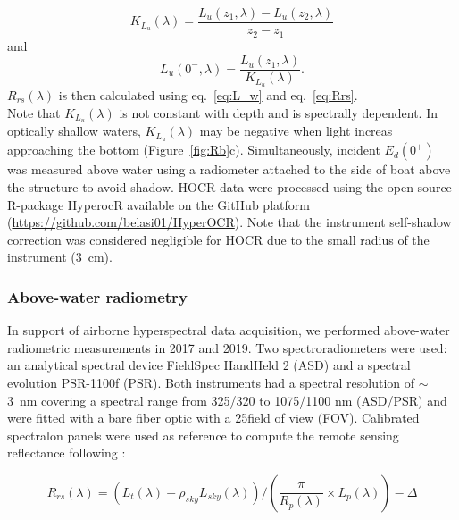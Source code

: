 \documentclass[essd, manuscript]{copernicus}
\begin{document}
\begin{equation}
    K_{L_u}(\lambda) = \frac{L_u(z_1,\lambda) - L_u(z_2,\lambda)}{z_2-z_1}
\end{equation}
and
\begin{equation}
    L_u(0^-,\lambda) = \frac{L_u(z_1,\lambda)}{K_{L_u}(\lambda)}.
\end{equation}
$R_{rs}(\lambda)$ is then calculated using eq.~\ref{eq:L_w} and eq.~\ref{eq:Rrs}. \\

Note that $K_{L_u}(\lambda)$ is not constant with depth and is spectrally dependent. In optically shallow waters, $K_{L_u}(\lambda)$ may be negative when light increas approaching the bottom (Figure~\ref{fig:Rb}c). Simultaneously, incident $E_d(0^+)$ was measured above water using a radiometer attached to the side of boat above the structure to avoid shadow. HOCR data were processed using the open-source R-package HyperocR available on the GitHub platform (\url{https://github.com/belasi01/HyperOCR}). Note that the instrument self-shadow correction was considered negligible for HOCR due to the small radius of the instrument (3~cm).\\  

\subsubsection{Above-water radiometry}
In support of airborne hyperspectral data acquisition, we performed above-water radiometric measurements in 2017 and 2019. Two spectroradiometers were used: an analytical spectral device FieldSpec HandHeld 2 (ASD) and a spectral evolution PSR-1100f (PSR). Both instruments had a spectral resolution of $\sim$3~nm covering a spectral range from 325/320 to 1075/1100 nm (ASD/PSR) and were fitted with a bare fiber optic with a 25\degree field of view (FOV). Calibrated spectralon panels were used as reference to compute the remote sensing reflectance following \citet{Mobley1999}: 

\begin{equation}
    \label{eq:Rrs_above}
    R_{rs}(\lambda) = (L_t(\lambda) - \rho_{sky}L_{sky}(\lambda)) / \left( \frac{\pi}{R_p(\lambda)}\times L_p(\lambda) \right) - \Delta
\end{equation}
\end{document}

